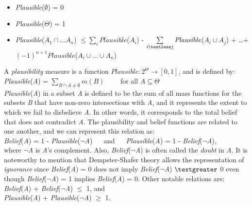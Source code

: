 \documentclass[11pt]{article}
\begin{document}
\begin{itemize}
	\item[]\textit{Plausible}($\emptyset$) = 0
	\item[]\textit{Plausible}($\Theta$) = 1
	\item[]\small\textit{Plausible}($A_1 \cap \ldots A_n$)
	$\leq \sum\limits_i\textit{Plausible}$($A_i$) - $\sum\limits_{i \textless
	j}\textit{Plausible}$($A_i \cup A_j$) + \ldots +\\
	$(-1)^{n+1}\textit{Plausible}$($A_i \cup \ldots \cup A_n$)
\end{itemize}

A \textit{plausibility} measure is a function
$Plausible:2^\Theta\rightarrow[0,1]$, and is defined by:\\

\textit{Plausible}(\textit{A}) = $\sum\limits_{B \cap A \neq
\emptyset}m(B)\qquad$ for all $A \subseteq \Theta$\\

\noindent \textit{Plausible}(\textit{A}) in a subset \textit{A} is defined to
be the sum of all mass functions for the subsets \textit{B} that have non-zero
intersections with \textit{A}, and it represents the extent to which we fail to
disbelieve \textit{A}. In other words, it corresponds to the total belief that
does not contradict \textit{A}. The plausibility and belief functions are
related to one another, and we can represent this relation as:\\

\noindent\textit{Belief}(\textit{A}) = 1 -
\textit{Plausible}(\textit{$\neg$A}) $\quad$ and $\quad$
\textit{Plausible}(\textit{A}) = 1 - \textit{Belief}(\textit{$\neg$A}),\\

\noindent where \textit{$\neg$A} is \textit{A}'s complement. Also,
\textit{Belief}(\textit{$\neg$A}) is often called the \textit{doubt} in
\textit{A}. It is noteworthy to mention that Dempster-Shafer theory allows the
representation of \textit{ignorance} since \textit{Belief}(\textit{A}) = 0 does
not imply \textit{Belief}(\textit{$\neg$A}) $\textgreater$ 0 even though
\textit{Belief}(\textit{$\neg$A}) = 1 implies \textit{Belief}(\textit{A}) = 0. Other
notable relations are:\\

\noindent\textit{Belief}(\textit{A}) + \textit{Belief}(\textit{$\neg$A}) $\leq$ 1,
and\\

\noindent\textit{Plausible}(\textit{A}) +
\textit{Plausible}(\textit{$\neg$A}) $\geq$ 1.\\
\end{document}
